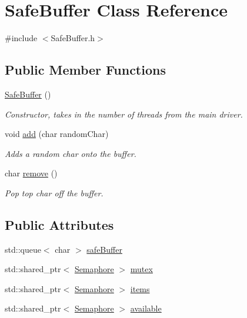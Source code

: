 \hypertarget{class_safe_buffer}{}\section{Safe\+Buffer Class Reference}
\label{class_safe_buffer}


{\ttfamily \#include $<$Safe\+Buffer.\+h$>$}

\subsection*{Public Member Functions}
\begin{DoxyCompactItemize}
\item 
\mbox{\hyperlink{class_safe_buffer_af835d8d08c4dcd3326f21ae2e9988699}{Safe\+Buffer}} ()
\begin{DoxyCompactList}\small\item\em Constructor, takes in the number of threads from the main driver. \end{DoxyCompactList}\item 
void \mbox{\hyperlink{class_safe_buffer_a4181b91d780945dd6a8ccd4d9a8b5345}{add}} (char random\+Char)
\begin{DoxyCompactList}\small\item\em Adds a random char onto the buffer. \end{DoxyCompactList}\item 
char \mbox{\hyperlink{class_safe_buffer_a164e4756c5e2f1ed4940e08f37366c9f}{remove}} ()
\begin{DoxyCompactList}\small\item\em Pop top char off the buffer. \end{DoxyCompactList}\end{DoxyCompactItemize}
\subsection*{Public Attributes}
\begin{DoxyCompactItemize}
\item 
std\+::queue$<$ char $>$ \mbox{\hyperlink{class_safe_buffer_a8db738cc1b4be3eeba47f322008a2c3e}{safe\+Buffer}}
\item 
std\+::shared\+\_\+ptr$<$ \mbox{\hyperlink{class_semaphore}{Semaphore}} $>$ \mbox{\hyperlink{class_safe_buffer_a7f90950b182359904348ff978ebb96c6}{mutex}}
\item 
std\+::shared\+\_\+ptr$<$ \mbox{\hyperlink{class_semaphore}{Semaphore}} $>$ \mbox{\hyperlink{class_safe_buffer_aab374b9839a583473e1ec8938715a8e7}{items}}
\item 
std\+::shared\+\_\+ptr$<$ \mbox{\hyperlink{class_semaphore}{Semaphore}} $>$ \mbox{\hyperlink{class_safe_buffer_a0ad0b633fecd803a5c061635be0f6d31}{available}}
\end{DoxyCompactItemize}



